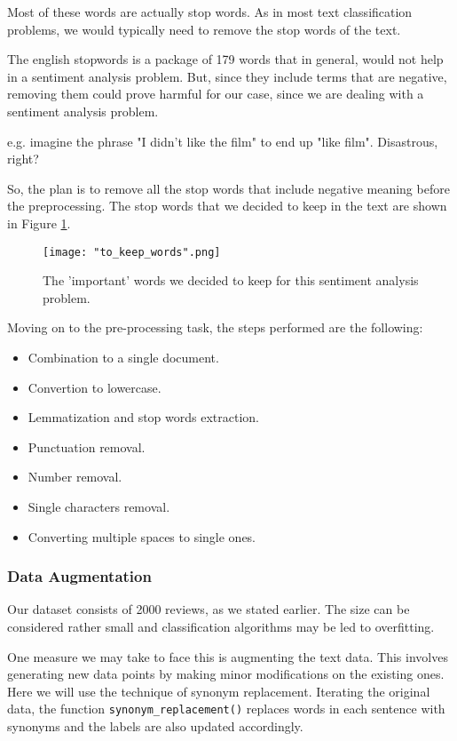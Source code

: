 \documentclass[10pt, a4paper]{article}
\begin{document}
	
	
	Most of these words are actually stop words. As in most text classification problems, we would typically need to remove the stop words of the text.
	
	The english stopwords is a package of 179 words that in general, would not help in a sentiment analysis problem. But, since they include terms that are negative, removing them could prove harmful for our case, since we are dealing with a sentiment analysis problem.
	
	e.g. imagine the phrase "I didn't like the film" to end up "like film". Disastrous, right?
	
	So, the plan is to remove all the stop words that include negative meaning before the preprocessing.
	The stop words that we decided to keep in the text are shown in Figure \ref{fig::to_keep}.
	
	\begin{figure}
		\centering
		\texttt{[image: "to\_keep\_words".png]}
		\caption{The 'important' words we decided to keep for this sentiment analysis problem.}
		\label{fig::to_keep}
	\end{figure}
	
	Moving on to the pre-processing task, the steps performed are the following:
	\begin{itemize}
		\item{ Combination to a single document.}
		\item{ Convertion to lowercase.}
		\item{Lemmatization and stop words extraction.}
		\item{ Punctuation removal.}
		\item{ Number removal.}
		\item{Single characters removal.}
		\item{ Converting multiple spaces to single ones.}
	\end{itemize}
 
        \subsubsection{Data Augmentation}
        Our dataset consists of 2000 reviews, as we stated earlier. The size can be considered rather small and classification algorithms may be led to overfitting. 
        
        One measure we may take to face this is augmenting the text data. This involves generating new data points by making minor modifications on the existing ones. Here we will use the technique of synonym replacement. Iterating the original data, the function \texttt{synonym\_replacement()} replaces words in each sentence with synonyms and the labels are also updated accordingly.
        
\end{document}
